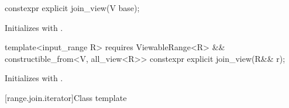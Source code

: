 %
\begin{itemdecl}
constexpr explicit join_view(V base);
\end{itemdecl}

\begin{itemdescr}
\pnum
\effects Initializes  with .
\end{itemdescr}

%
\begin{itemdecl}
template<input_range R>
  requires ViewableRange<R> && constructible_from<V, all_view<R>>
constexpr explicit join_view(R&& r);
\end{itemdecl}

\begin{itemdescr}
\pnum
\effects Initializes  with .
\end{itemdescr}

[range.join.iterator]{Class template }

